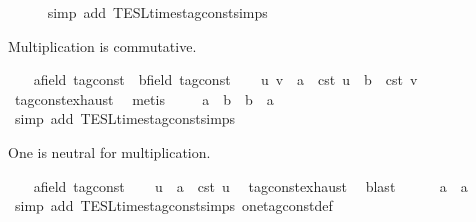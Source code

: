 \begin{isabellebody}
\ \ \ \ \isamarkupfalse%
\ {\isacharparenleft}simp\ add{\isacharcolon}\ TESL{\isachardot}times{\isacharunderscore}tag{\isacharunderscore}const{\isachardot}simps{\isacharparenright}\isanewline
{}\isamarkupfalse%
%
\begin{isamarkuptext}%
Multiplication is commutative.%
\end{isamarkuptext}\isamarkuptrue%
\ \ \isamarkupfalse%
\ a{\isacharcolon}{\isacharcolon}{\isacartoucheopen}{\isacharprime}{\isasymtau}{\isacharcolon}{\isacharcolon}field\ tag{\isacharunderscore}const{\isacartoucheclose}\ \ b{\isacharcolon}{\isacharcolon}{\isacartoucheopen}{\isacharprime}{\isasymtau}{\isacharcolon}{\isacharcolon}field\ tag{\isacharunderscore}const{\isacartoucheclose}\isanewline
\ \ \isamarkupfalse%
\ u\ v\ \ {\isacartoucheopen}a\ {\isacharequal}\ {\isasymtau}\isactrlsub c\isactrlsub s\isactrlsub t\ u{\isacartoucheclose}\ \ {\isacartoucheopen}b\ {\isacharequal}\ {\isasymtau}\isactrlsub c\isactrlsub s\isactrlsub t\ v{\isacartoucheclose}\ \isamarkupfalse%
\ tag{\isacharunderscore}const{\isachardot}exhaust\ \isamarkupfalse%
\ metis\isanewline
\ \ \isamarkupfalse%
\ {\isacartoucheopen}\ a\ {\isacharasterisk}\ b\ {\isacharequal}\ b\ {\isacharasterisk}\ a{\isacartoucheclose}\isanewline
\ \ \ \ \isamarkupfalse%
\ {\isacharparenleft}simp\ add{\isacharcolon}\ TESL{\isachardot}times{\isacharunderscore}tag{\isacharunderscore}const{\isachardot}simps{\isacharparenright}\isanewline
{}\isamarkupfalse%
%
\begin{isamarkuptext}%
One is neutral for multiplication.%
\end{isamarkuptext}\isamarkuptrue%
\ \ \isamarkupfalse%
\ a{\isacharcolon}{\isacharcolon}{\isacartoucheopen}{\isacharprime}{\isasymtau}{\isacharcolon}{\isacharcolon}field\ tag{\isacharunderscore}const{\isacartoucheclose}\isanewline
\ \ \isamarkupfalse%
\ u\ \ {\isacartoucheopen}a\ {\isacharequal}\ {\isasymtau}\isactrlsub c\isactrlsub s\isactrlsub t\ u{\isacartoucheclose}\ \isamarkupfalse%
\ tag{\isacharunderscore}const{\isachardot}exhaust\ \isamarkupfalse%
\ blast\isanewline
\ \ \isamarkupfalse%
\ {\isacartoucheopen}{}\ {\isacharasterisk}\ a\ {\isacharequal}\ a{\isacartoucheclose}\isanewline
\ \ \ \ \isamarkupfalse%
\ {\isacharparenleft}simp\ add{\isacharcolon}\ TESL{\isachardot}times{\isacharunderscore}tag{\isacharunderscore}const{\isachardot}simps\ one{\isacharunderscore}tag{\isacharunderscore}const{\isacharunderscore}def{\isacharparenright}\isanewline

\end{isabellebody}
